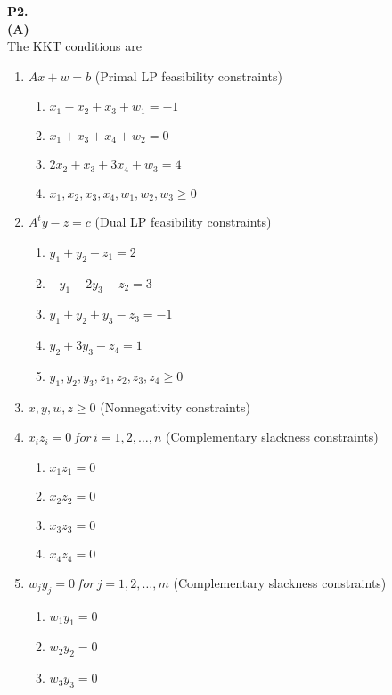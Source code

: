 \documentclass[11pt]{article}
\begin{document}
\noindent\textbf{P2.}
\\
\noindent\textbf{(A)}
\\
The KKT conditions are
\begin{enumerate}
  \item $Ax + w = b$ (Primal LP feasibility constraints)
  \begin{enumerate}
    \item $x_1 - x_2 + x_3 + w_1 = -1$
    \item $x_1 + x_3 + x_4 + w_2 = 0$
    \item $2x_2 + x_3 +3x_4 + w_3= 4$
    \item $x_1, x_2, x_3, x_4, w_1, w_2, w_3 \geq 0 $
  \end{enumerate}
  \item $A^{t}y - z = c$ (Dual LP feasibility constraints)
  \begin{enumerate}
    \item $y_1 + y_2 - z_1 = 2$
    \item $-y_1 + 2y_3 - z_2 = 3$
    \item $y_1 + y_2 + y_3 - z_3 = -1$
    \item $y_2 + 3y_3 -z_4 = 1$
    \item $y_1, y_2, y_3, z_1, z_2, z_3, z_4 \geq 0$
  \end{enumerate}
  \item $x, y, w, z \geq 0$ (Nonnegativity constraints)
  \item $x_iz_i = 0 \, for \, i = 1,2,\ldots,n$ (Complementary slackness constraints)
  \begin{enumerate}
    \item $x_1z_1 = 0$
    \item $x_2z_2 = 0$
    \item $x_3z_3 = 0$
    \item $x_4z_4 = 0$
  \end{enumerate}
  \item $w_jy_j = 0 \, for \, j = 1,2,\ldots,m$ (Complementary slackness constraints)
  \begin{enumerate}
    \item $w_1y_1 = 0$
    \item $w_2y_2 = 0$
    \item $w_3y_3 = 0$
  \end{enumerate}
\end{enumerate}
\end{document}
